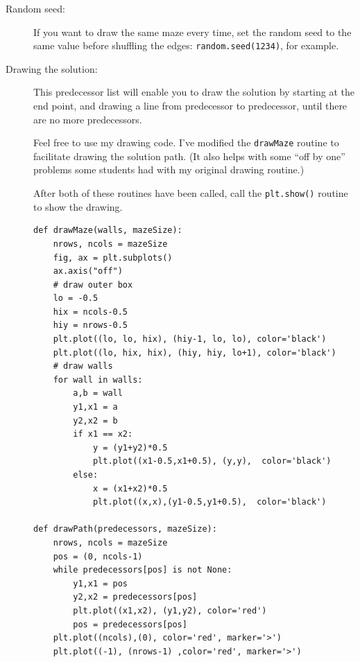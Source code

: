 \documentclass{article}
\begin{document}
\begin{description}
\item[Random seed:] If you want to draw the same maze
every time, set the random seed to the same value before
shuffling the edges:  {\tt random.seed(1234)}, for example. 
\item[Drawing the solution:]
This predecessor list will enable
you to draw the solution by starting at the end point, and drawing
a line from predecessor to predecessor, until there are no more
predecessors.

Feel free to use my drawing code.  I've modified the {\tt drawMaze}
routine to facilitate drawing the solution path.  (It also helps with
some ``off by one'' problems some students had with my original
drawing routine.)  

After both of these routines have been called, call the {\tt plt.show()}
routine to show the drawing.

\begin{lstlisting}
def drawMaze(walls, mazeSize):
    nrows, ncols = mazeSize
    fig, ax = plt.subplots()
    ax.axis("off")
    # draw outer box
    lo = -0.5
    hix = ncols-0.5
    hiy = nrows-0.5
    plt.plot((lo, lo, hix), (hiy-1, lo, lo), color='black')
    plt.plot((lo, hix, hix), (hiy, hiy, lo+1), color='black')
    # draw walls
    for wall in walls:
        a,b = wall
        y1,x1 = a
        y2,x2 = b
        if x1 == x2:
            y = (y1+y2)*0.5
            plt.plot((x1-0.5,x1+0.5), (y,y),  color='black')
        else:
            x = (x1+x2)*0.5
            plt.plot((x,x),(y1-0.5,y1+0.5),  color='black')
            
def drawPath(predecessors, mazeSize):
    nrows, ncols = mazeSize
    pos = (0, ncols-1)
    while predecessors[pos] is not None:
        y1,x1 = pos
        y2,x2 = predecessors[pos]
        plt.plot((x1,x2), (y1,y2), color='red')
        pos = predecessors[pos]
    plt.plot((ncols),(0), color='red', marker='>')
    plt.plot((-1), (nrows-1) ,color='red', marker='>')
\end{lstlisting}

\end{description}
\end{document}
